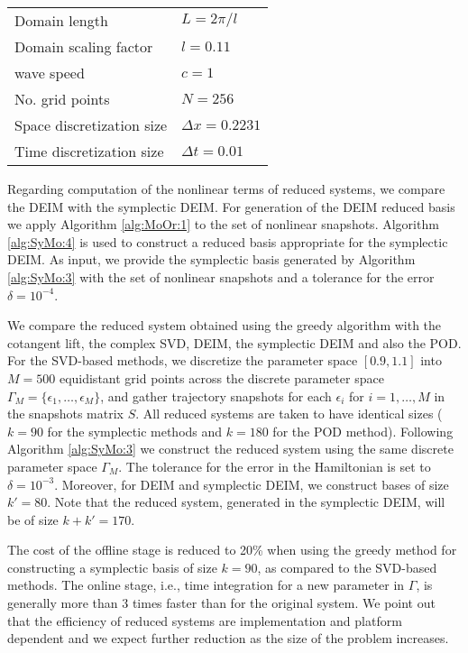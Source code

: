 \documentclass[final]{siamart}
\begin{document}
\vspace{0.5cm}
\begin{center}
\begin{tabular}{|l|l|}
\hline
Domain length & $L = 2\pi /l$ \\
Domain scaling factor & $l = 0.11$ \\
wave speed & $c =1$\\
No. grid points & $N = 256$ \\
Space discretization size & $\Delta x = 0.2231$ \\
Time discretization size & $\Delta t = 0.01$ \\
\hline
\end{tabular}
\end{center}
\vspace{0.5cm}
Regarding computation of the nonlinear terms of reduced systems, {{\color{black}} we} compare the DEIM with the symplectic DEIM. For generation of the DEIM reduced basis we apply Algorithm \ref{alg:MoOr:1} to the set of nonlinear snapshots. Algorithm \ref{alg:SyMo:4} is used to construct a reduced basis appropriate for the symplectic DEIM. As input, we provide the symplectic basis generated by Algorithm \ref{alg:SyMo:3} with the set of nonlinear snapshots and a tolerance for the error $\delta = 10^{-4}$.

We compare the reduced system obtained using the greedy algorithm with the cotangent lift, the complex SVD, DEIM, the symplectic DEIM and also the POD. For the SVD-based methods, we discretize the parameter space $[0.9,1.1]$ into $M=500$ equidistant grid points {{\color{black}} across} the discrete parameter space $\Gamma_M = \{\epsilon_1,\dots,\epsilon_M \}$, and gather trajectory snapshots for each $\epsilon_i$ for $i = 1,\dots,M$ in the snapshots matrix $S$. All reduced systems are taken to have identical sizes ($k=90$ for the symplectic methods and $k=180$ for the POD method). Following Algorithm \ref{alg:SyMo:3} we construct the reduced system using the same discrete parameter space $\Gamma_M$. The tolerance for the error in the Hamiltonian is set to $\delta = 10^{-3}$. Moreover, for DEIM and symplectic DEIM, we construct bases of size $k'=80$. Note that the reduced system, generated in the symplectic DEIM, will be of size $k+k'=170$.

The cost of the offline stage is reduced to 20\% when using the greedy method for constructing a symplectic basis of size $k=90$, as compared to the SVD-based methods. The online stage, i.e., time integration for a new parameter in $\Gamma$, is generally more than 3 times faster than {{\color{black}} for} the original system. We point out that the efficiency of reduced systems are implementation and platform dependent {{\color{black}} and we expect further reduction as the size of the problem increases.}
\end{document}
